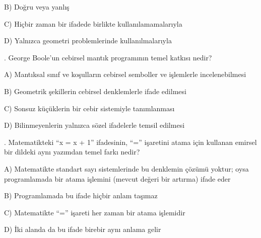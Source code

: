 \par\noindent\hspace*{1.6em}B) Doğru veya yanlış

\par\noindent\hspace*{1.6em}C) Hiçbir zaman bir ifadede birlikte kullanılamamalarıyla

\par\noindent\hspace*{1.6em}D) Yalnızca geometri problemlerinde kullanılmalarıyla

\par\smallskip{}. George Boole’un cebirsel mantık programının temel katkısı nedir?

\par\noindent\hspace*{1.6em}A) Mantıksal sınıf ve koşulların cebirsel semboller ve işlemlerle incelenebilmesi

\par\noindent\hspace*{1.6em}B) Geometrik şekillerin cebirsel denklemlerle ifade edilmesi

\par\noindent\hspace*{1.6em}C) Sonsuz küçüklerin bir cebir sistemiyle tanımlanması

\par\noindent\hspace*{1.6em}D) Bilinmeyenlerin yalnızca sözel ifadelerle temsil edilmesi

\par\smallskip{}. Matematikteki “x = x + 1” ifadesinin, “=” işaretini atama için kullanan emirsel bir dildeki aynı yazımdan temel farkı nedir?

\par\noindent\hspace*{1.6em}A) Matematikte standart sayı sistemlerinde bu denklemin çözümü yoktur; oysa programlamada bir atama işlemini (mevcut değeri bir artırma) ifade eder

\par\noindent\hspace*{1.6em}B) Programlamada bu ifade hiçbir anlam taşımaz

\par\noindent\hspace*{1.6em}C) Matematikte “=” işareti her zaman bir atama işlemidir

\par\noindent\hspace*{1.6em}D) İki alanda da bu ifade birebir aynı anlama gelir

